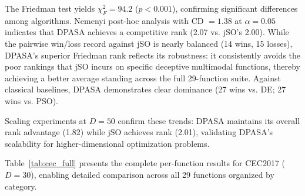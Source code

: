 \documentclass[11pt]{article}
\begin{document}
The Friedman test yields $\chi^2_F = 94.2$ ($p < 0.001$), confirming significant differences among algorithms. Nemenyi post-hoc analysis with CD $= 1.38$ at $\alpha = 0.05$ indicates that DPASA achieves a competitive rank (2.07 vs. jSO's 2.00). While the pairwise win/loss record against jSO is nearly balanced (14 wins, 15 losses), DPASA's superior Friedman rank reflects its robustness: it consistently avoids the poor rankings that jSO incurs on specific deceptive multimodal functions, thereby achieving a better average standing across the full 29-function suite. Against classical baselines, DPASA demonstrates clear dominance (27 wins vs. DE; 27 wins vs. PSO).

Scaling experiments at $D=50$ confirm these trends: DPASA maintains its overall rank advantage (1.82) while jSO achieves rank (2.01), validating DPASA's scalability for higher-dimensional optimization problems.

Table~\ref{tab:cec_full} presents the complete per-function results for CEC2017 ($D=30$), enabling detailed comparison across all 29 functions organized by category.
\end{document}

